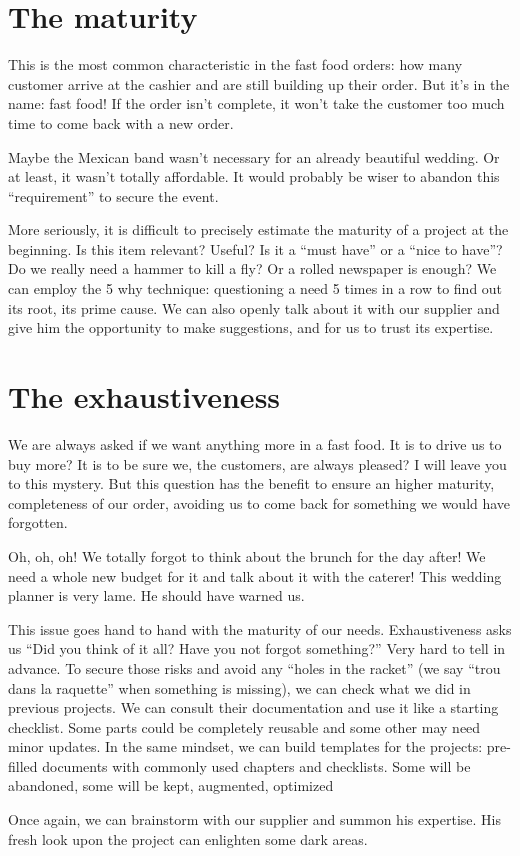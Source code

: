 \section{The maturity}
This is the most common characteristic in the fast food orders: how many customer arrive at the cashier and are still building up their order. But it’s in the name: fast food! If the order isn’t complete, it won’t take the customer too much time to come back with a new order.

Maybe the Mexican band wasn’t necessary for an already beautiful wedding. Or at least, it wasn’t totally affordable. It would probably be wiser to abandon this “requirement” to secure the event.

More seriously, it is difficult to precisely estimate the maturity of a project at the beginning. Is this item relevant? Useful? Is it a “must have” or a “nice to have”? Do we really need a hammer to kill a fly? Or a rolled newspaper is enough? We can employ the 5 why technique: questioning a need 5 times in a row to find out its root, its prime cause.
We can also openly talk about it with our supplier and give him the opportunity to make suggestions, and for us to trust its expertise.


\section{The exhaustiveness}
We are always asked if we want anything more in a fast food. It is to drive us to buy more? It is to be sure we, the customers, are always pleased? I will leave you to this mystery. But this question has the benefit to ensure an higher maturity, completeness of our order, avoiding us to come back for something we would have forgotten.

Oh, oh, oh! We totally forgot to think about the brunch for the day after! We need a whole new budget for it and talk about it with the caterer! This wedding planner is very lame. He should have warned us.

This issue goes hand to hand with the maturity of our needs. Exhaustiveness asks us “Did you think of it all? Have you not forgot something?” Very hard to tell in advance.
To secure those risks and avoid any “holes in the racket” (we say “trou dans la raquette” when something is missing), we can check what we did in previous projects. We can consult their documentation and use it like a starting checklist. Some parts could be completely reusable and some other may need minor updates. In the same mindset, we can build templates for the projects: pre-filled documents with commonly used chapters and checklists. Some will be abandoned, some will be kept, augmented, optimized

Once again, we can brainstorm with our supplier and summon his expertise. His fresh look upon the project can enlighten some dark areas.

